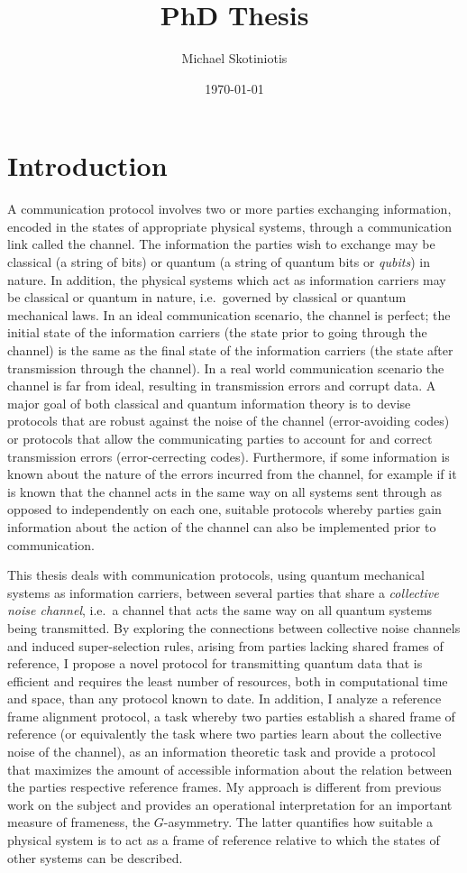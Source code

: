 \documentclass{article}
\newcommand\defn[1]{\textsl{#1}}
\begin{document}
\title{PhD Thesis}
\author{Michael Skotiniotis}
\date{\today}
\maketitle


\section{\label{sec:1}Introduction}
A communication protocol involves two or more parties exchanging information, encoded in the states of appropriate physical systems, through a communication link called the channel.  The information the parties wish to exchange may be classical (a string of bits) or quantum (a string of quantum bits or \defn{qubits}) in nature.  In addition, the physical systems which act as information carriers may be classical or quantum in nature, i.e.~governed by classical or quantum mechanical laws.  In an ideal communication scenario, the channel is perfect;  the initial state of the information carriers (the state prior to going through the channel) is the same as the final state of the information carriers (the state after transmission through the channel).  In a real world communication scenario the channel is far from ideal, resulting in transmission errors and corrupt data.  A major goal of both classical and quantum information theory is to devise protocols that are robust against the noise of the channel (error-avoiding codes) or  protocols that allow the communicating parties to account for and correct  transmission errors (error-cerrecting codes).  Furthermore, if some information is known about the nature of the errors incurred from the channel, for example if it is known that the channel acts in the same way on all systems sent through as opposed to independently on each one, suitable protocols whereby parties gain information about the action of the channel can also be implemented prior to communication.

This thesis deals with communication protocols, using quantum mechanical systems as information carriers, between several parties that share a \defn{collective noise channel}, i.e.~a channel that acts the same way on all quantum systems being transmitted.  By exploring the connections between collective noise channels and induced super-selection rules, arising from parties lacking shared frames of reference, I propose a novel protocol for transmitting quantum data that is efficient and requires the least number of resources, both in computational time and space, than any protocol known to date.  In addition, I analyze a reference frame alignment protocol, a task whereby two parties establish a shared frame of reference (or equivalently the task where two parties learn about the collective noise of the channel), as an information theoretic task and provide a protocol that maximizes the amount of accessible information about the relation between the parties respective reference frames.  My approach is different from previous work on the subject and provides an operational interpretation for an important measure of frameness, the $G$-asymmetry. The latter quantifies how suitable a physical system is to act as a frame of reference relative to which the states of other systems can be described. 
\end{document}
